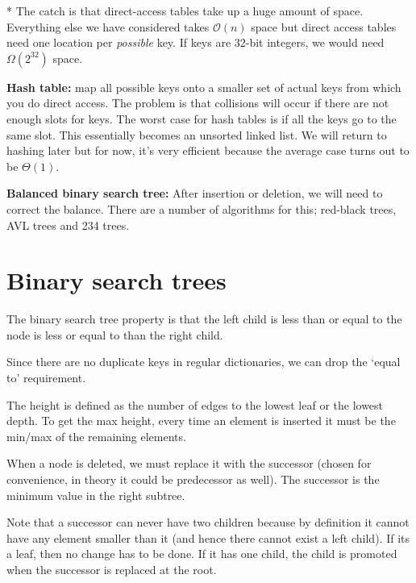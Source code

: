 \documentclass[11pt]{article}
\begin{document}
* The catch is that direct-access tables take up a huge amount of space. Everything else we have considered takes $\mathcal{O}(n)$ space but direct access tables need one location per \emph{possible} key. If keys are 32-bit integers, we would need $\Omega(2^{32})$ space. 

\textbf{Hash table:} map all possible keys onto a smaller set of actual keys from which you do direct access. The problem is that collisions will occur if there are not enough slots for keys. The worst case for hash tables is if all the keys go to the same slot. This essentially becomes an unsorted linked list. We will return to hashing later but for now, it's very efficient because the average case turns out to be $\Theta(1)$. 

\textbf{Balanced binary search tree:} After insertion or deletion, we will need to correct the balance. There are a number of algorithms for this; red-black trees, AVL trees and 234 trees. 

\newpage 
\section{Binary search trees} 
The binary search tree property is that the left child is less than or equal to the node is less or equal to than the right child. 

Since there are no duplicate keys in regular dictionaries, we can drop the `equal to' requirement. 


The height is defined as the number of edges to the lowest leaf or the lowest depth. To get the max height, every time an element is inserted it must be the min/max of the remaining elements. 




When a node is deleted, we must replace it with the successor (chosen for convenience, in theory it could be predecessor as well). The successor is the minimum value in the right subtree. 

Note that a successor can never have two children because by definition it cannot have any element smaller than it (and hence there cannot exist a left child). If its a leaf, then no change has to be done. If it has one child, the child is promoted when the successor is replaced at the root. 
\end{document}
